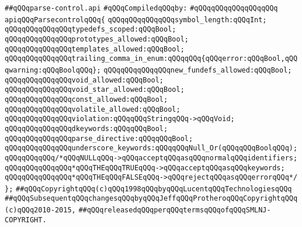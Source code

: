 \label{src/lib/c-kit/src/variants/parse-control.api}
\verb|##qQQqparse-control.api|\newline
\newline
\verb|#qQQqCompiledqQQqby:|\newline
\verb|#qQQqqQQqqQQqqQQqqQQq|\newline
\newline
\newline
\newline
\verb|apiqQQqParsecontrolqQQq{|\newline
\newline
\verb|qQQqqQQqqQQqqQQqsymbol_length:qQQqInt;|\newline
\verb|qQQqqQQqqQQqqQQqtypedefs_scoped:qQQqBool;|\newline
\verb|qQQqqQQqqQQqqQQqprototypes_allowed:qQQqBool;|\newline
\verb|qQQqqQQqqQQqqQQqtemplates_allowed:qQQqBool;|\newline
\verb|qQQqqQQqqQQqqQQqtrailing_comma_in_enum:qQQqqQQq{qQQqerror:qQQqBool,qQQqwarning:qQQqBoolqQQq};|\newline
\verb|qQQqqQQqqQQqqQQqnew_fundefs_allowed:qQQqBool;|\newline
\verb|qQQqqQQqqQQqqQQqvoid_allowed:qQQqBool;|\newline
\verb|qQQqqQQqqQQqqQQqvoid_star_allowed:qQQqBool;|\newline
\verb|qQQqqQQqqQQqqQQqconst_allowed:qQQqBool;|\newline
\verb|qQQqqQQqqQQqqQQqvolatile_allowed:qQQqBool;|\newline
\verb|qQQqqQQqqQQqqQQqviolation:qQQqqQQqStringqQQq->qQQqVoid;|\newline
\verb|qQQqqQQqqQQqqQQqdkeywords:qQQqqQQqBool;|\newline
\verb|qQQqqQQqqQQqqQQqparse_directive:qQQqqQQqBool;|\newline
\verb|qQQqqQQqqQQqqQQqunderscore_keywords:qQQqqQQqNull_Or(qQQqqQQqBoolqQQq);|\newline
\verb|qQQqqQQqqQQq/*qQQqNULLqQQq->qQQqacceptqQQqasqQQqnormalqQQqidentifiers;|\newline
\verb|qQQqqQQqqQQqqQQq*qQQqTHEqQQqTRUEqQQq->qQQqacceptqQQqasqQQqkeywords;|\newline
\verb|qQQqqQQqqQQqqQQq*qQQqTHEqQQqFALSEqQQq->qQQqrejectqQQqasqQQqerrorqQQq*/|\newline
\verb|};|\newline
\newline
\newline
\newline
\verb|##qQQqCopyrightqQQq(c)qQQq1998qQQqbyqQQqLucentqQQqTechnologiesqQQq|\newline
\verb|##qQQqSubsequentqQQqchangesqQQqbyqQQqJeffqQQqProtheroqQQqCopyrightqQQq(c)qQQq2010-2015,|\newline
\verb|##qQQqreleasedqQQqperqQQqtermsqQQqofqQQqSMLNJ-COPYRIGHT.|\newline

